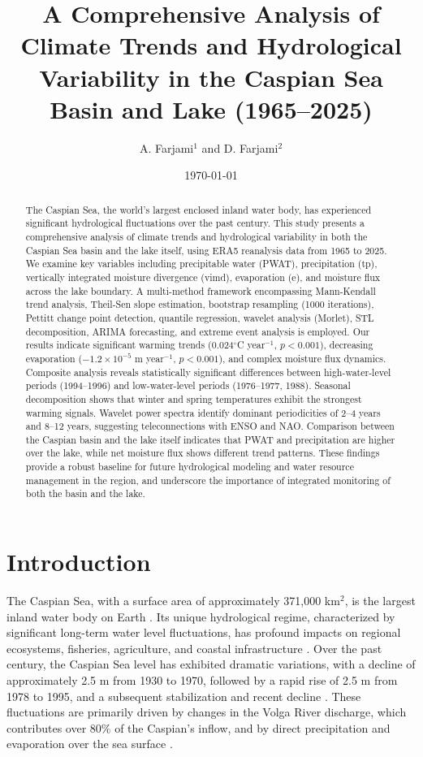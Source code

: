 \documentclass[12pt,a4paper]{article}
\title{A Comprehensive Analysis of Climate Trends and Hydrological Variability in the Caspian Sea Basin and Lake (1965--2025)}
\author{A. Farjami$^{1}$ and D. Farjami$^{2}$}
\affiliation{$^1$Department of Climatology, University of Tehran, Iran\\
$^2$Department of Hydrology, University of Tehran, Iran}
\date{\today}
\begin{document}
\maketitle

\begin{abstract}
The Caspian Sea, the world's largest enclosed inland water body, has experienced significant hydrological fluctuations over the past century. This study presents a comprehensive analysis of climate trends and hydrological variability in both the Caspian Sea basin and the lake itself, using ERA5 reanalysis data from 1965 to 2025. We examine key variables including precipitable water (PWAT), precipitation (tp), vertically integrated moisture divergence (vimd), evaporation (e), and moisture flux across the lake boundary. A multi-method framework encompassing Mann-Kendall trend analysis, Theil-Sen slope estimation, bootstrap resampling (1000 iterations), Pettitt change point detection, quantile regression, wavelet analysis (Morlet), STL decomposition, ARIMA forecasting, and extreme event analysis is employed. Our results indicate significant warming trends (0.024$^\circ$C year$^{-1}$, $p<0.001$), decreasing evaporation ($-1.2\times10^{-5}$ m year$^{-1}$, $p<0.001$), and complex moisture flux dynamics. Composite analysis reveals statistically significant differences between high-water-level periods (1994--1996) and low-water-level periods (1976--1977, 1988). Seasonal decomposition shows that winter and spring temperatures exhibit the strongest warming signals. Wavelet power spectra identify dominant periodicities of 2--4 years and 8--12 years, suggesting teleconnections with ENSO and NAO. Comparison between the Caspian basin and the lake itself indicates that PWAT and precipitation are higher over the lake, while net moisture flux shows different trend patterns. These findings provide a robust baseline for future hydrological modeling and water resource management in the region, and underscore the importance of integrated monitoring of both the basin and the lake.
\end{abstract}

\section{Introduction}
The Caspian Sea, with a surface area of approximately 371,000 km$^2$, is the largest inland water body on Earth \citep{kostianoy2014}. Its unique hydrological regime, characterized by significant long-term water level fluctuations, has profound impacts on regional ecosystems, fisheries, agriculture, and coastal infrastructure \citep{terziev1992,golubov1998}. Over the past century, the Caspian Sea level has exhibited dramatic variations, with a decline of approximately 2.5 m from 1930 to 1970, followed by a rapid rise of 2.5 m from 1978 to 1995, and a subsequent stabilization and recent decline \citep{arpad2006}. These fluctuations are primarily driven by changes in the Volga River discharge, which contributes over 80\% of the Caspian's inflow, and by direct precipitation and evaporation over the sea surface \citep{kislov2018}.
\end{document}
